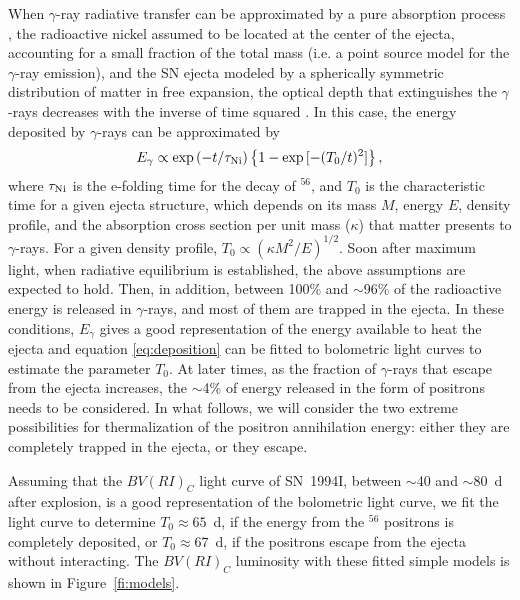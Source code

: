 \documentclass[12pt,manuscript]{aastex}
\begin{document}
When $\gamma$-ray radiative transfer can be approximated by a 
pure absorption process \citep{SandW84}, the radioactive nickel
assumed to be located at the center of the ejecta, accounting
for a small fraction of the total mass (i.e. a point source model
for the $\gamma$-ray emission), and the SN ejecta modeled
by a spherically symmetric 
distribution of matter in free expansion, the optical depth that 
extinguishes the $\gamma$-rays decreases with the inverse of time 
squared \citep[e.g.][]{candw97}.
%
In this case, the energy deposited by $\gamma$-rays can be 
approximated by
\begin{equation}\label {eq:deposition}
E_\gamma \propto \exp{(-{t/\tau_{\rm Ni}})}   \left\{1 - \exp{[-({T_0/t})^2]}\right\},
\end{equation}
\noindent
where $\tau_{\rm Ni}$ is the e-folding time for the decay 
of $^{56}$, and $T_0$ is the characteristic time
for a given ejecta structure, which depends on its mass $M$, energy 
$E$, density profile, and the absorption cross section per unit 
mass ($\kappa$) that matter presents to $\gamma$-rays.
%
For a given density profile, $T_0 \propto (\kappa M^2/E)^{1/2}$.
%
Soon after maximum light, when radiative equilibrium is established, 
the above assumptions are expected to hold.
%
Then, in addition, between 100\% and $\sim$96\% of the
radioactive energy is released in $\gamma$-rays, and most of them
are trapped in the ejecta.
%
In these conditions, $E_\gamma$ gives a good representation of the
energy available to heat the ejecta and
equation \ref{eq:deposition} can be fitted to bolometric light
curves to estimate the parameter $T_0$.
%
At later times, as the fraction of $\gamma$-rays that escape from the
ejecta increases, the $\sim$4\% of energy released in the form of
positrons needs to be considered.
%
In what follows, we will consider the two extreme possibilities for
thermalization of the positron annihilation energy: either they are
completely trapped in the ejecta, or they escape.

Assuming that the $BV(RI)_C$ light curve of SN~1994I, between 
$\sim$40 and $\sim$80~d after explosion, is a good representation 
of the bolometric light curve, we fit the light curve to determine
$T_0 \approx 65$~d, if the energy from the $^{56}$ 
positrons is completely deposited, or $T_0 \approx 67$~d, if 
the positrons escape from the ejecta without interacting.
%
The $BV(RI)_C$ luminosity with these fitted simple models is 
shown in Figure~\ref{fi:models}.
\end{document}
